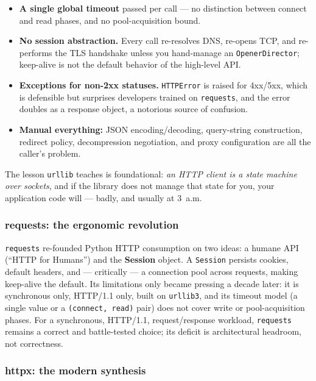 \begin{itemize}
  \item \textbf{A single global timeout} passed per call --- no distinction
        between connect and read phases, and no pool-acquisition bound.
  \item \textbf{No session abstraction.} Every call re-resolves DNS,
        re-opens TCP, and re-performs the TLS handshake unless you hand-manage
        an \texttt{OpenerDirector}; keep-alive is not the default behavior of
        the high-level API.
  \item \textbf{Exceptions for non-2xx statuses.} \texttt{HTTPError} is
        raised for 4xx/5xx, which is defensible but surprises developers
        trained on \texttt{requests}, and the error doubles as a response
        object, a notorious source of confusion.
  \item \textbf{Manual everything:} JSON encoding/decoding, query-string
        construction, redirect policy, decompression negotiation, and proxy
        configuration are all the caller's problem.
\end{itemize}

The lesson \texttt{urllib} teaches is foundational: \emph{an HTTP client is a
state machine over sockets}, and if the library does not manage that state for
you, your application code will --- badly, and usually at 3~a.m.

\subsubsection{requests: the ergonomic revolution}

\texttt{requests} \cite{requestsdocs} re-founded Python HTTP consumption on
two ideas: a humane API (``HTTP for Humans'') and the \textbf{Session} object.
A \texttt{Session} persists cookies, default headers, and --- critically ---
a connection pool across requests, making keep-alive the default. Its
limitations only became pressing a decade later: it is synchronous only,
HTTP/1.1 only, built on \texttt{urllib3}, and its timeout model (a single
value or a \texttt{(connect, read)} pair) does not cover write or
pool-acquisition phases. For a synchronous, HTTP/1.1, request/response
workload, \texttt{requests} remains a correct and battle-tested choice; its
deficit is architectural headroom, not correctness.

\subsubsection{httpx: the modern synthesis}

